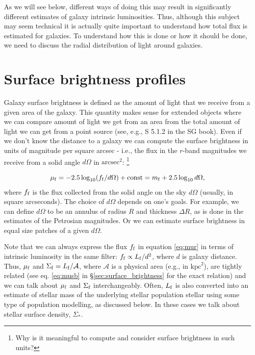 As we will see below, different ways of doing this may result in significantly different estimates of galaxy intrinsic luminosities. Thus, although this subject may seem technical it is actually quite important to understand how total flux is estimated for galaxies. To understand how this is done or how it should be
done, we need to discuss the radial distribution of light around galaxies. 

\section{Surface brightness profiles}

Galaxy surface brightness is defined as the amount of light that we receive from a given area of the galaxy. This quantity makes sense for extended objects where we can compare amount of light we get from an area from the total amount of light we can get from a point source (see, e.g., S 5.1.2 in the SG book). 
Even if we don't know the distance to a galaxy we can compute the surface brightness in units of magnitude per square arcsec - i.e., the flux in the $r$-band magnitudes we receive from a solid angle $d\Omega$ in $\mathrm{arcsec}^2$: \footnote{Why is it meaningful to compute and consider surface brightness in such units?}

\begin{equation}
\mu_{\rm f}=-2.5\log_{10}(f_{\rm f}/d\Omega) + \mathrm{const}=m_{\rm f}+2.5\log_{10}d\Omega, 
\label{eq:mur}
\end{equation}
where $f_{\rm f}$ is the flux collected from the solid angle on the sky $d\Omega$ (usually, in square arcseconds). 
The choice of  $d\Omega$ depends on one's goals. For example, we can define $d\Omega$ to be an annulus of radius $R$ and thickness $\Delta R$, as is done in the estimates of the Petrosian magnitudes. 
Or we can estimate surface brightness in equal size patches of a given $d\Omega$.

Note that we can always express the flux $f_{\rm f}$ in equation \ref{eq:mur} in terms of intrinsic luminosity in the same filter: $f_{\rm f}\propto L_{\rm f}/d^2$, where $d$ is galaxy distance. Thus, $\mu_{\rm f}$ and  $\Sigma_{\rm f}=L_{\rm f}/\mathcal{A}$, where $\mathcal{A}$ is a physical area (e.g., in $\mathrm{kpc}^2$), are tightly related (see eq. \ref{eq:musb} in \S \ref{sec:surface_brightness} for the exact relation) and we can talk about $\mu_{\rm f}$ and $\Sigma_{\rm f}$ interchangeably.  Often, $L_{\rm f}$ is also converted into an estimate of stellar mass of the underlying stellar population stellar using some type of population modelling, as discussed below. In these cases we talk about stellar surface density, $\Sigma_\ast$. 

